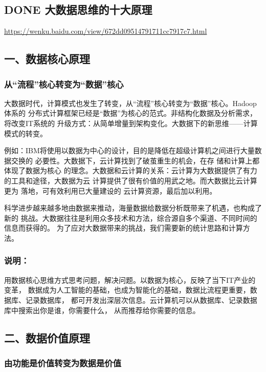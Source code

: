 \documentclass[11pt]{ctexart}
\begin{document}
{{{{\subsection{{\bfseries\sffamily DONE} 大数据思维的十大原理}
\label{sec:org79bb11c}
\url{https://wenku.baidu.com/view/672dd09514791711cc7917c7.html}

\subsection{一、数据核心原理}
\label{sec:orgfcab892}

\subsubsection{从“流程”核心转变为“数据”核心}
\label{sec:org6bb7e2e}

大数据时代，计算模式也发生了转变，从“流程”核心转变为“数据”核心。Hadoop体系的
分布式计算框架已经是“数据”为核心的范式。非结构化数据及分析需求，将改变IT系统的
升级方式：从简单增量到架构变化。大数据下的新思维——计算模式的转变。

例如：IBM将使用以数据为中心的设计，目的是降低在超级计算机之间进行大量数据交换的
必要性。大数据下，云计算找到了破茧重生的机会，在存 储和计算上都体现了数据为核心
的理念。大数据和云计算的关系：云计算为大数据提供了有力的工具和途径，大数据为云
计算提供了很有价值的用武之地。而大数据比云计算更为 落地，可有效利用已大量建设的
云计算资源，最后加以利用。


科学进步越来越多地由数据来推动，海量数据给数据分析既带来了机遇，也构成了新的
挑战。大数据往往是利用众多技术和方法，综合源自多个渠道、不同时间的信息而获得的。
为了应对大数据带来的挑战，我们需要新的统计思路和计算方法。

\subsubsection{说明：}
\label{sec:org493455c}
用数据核心思维方式思考问题，解决问题。以数据为核心，反映了当下IT产业的变革，
数据成为人工智能的基础，也成为智能化的基础，数据比流程更重要，数据库、记录数据库，
都可开发出深层次信息。云计算机可以从数据库、记录数据库中搜索出你是谁，你需要什么，
从而推荐给你需要的信息。

\subsection{二、数据价值原理}
\label{sec:org466447e}

\subsubsection{由功能是价值转变为数据是价值}
\label{sec:orgbc30561}

}}}}
\end{document}
